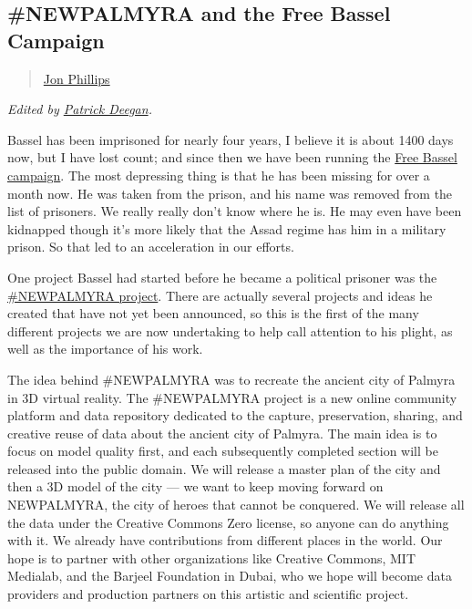 \subsection{\#NEWPALMYRA and the Free Bassel
Campaign}\label{newpalmyra-and-the-free-bassel-campaign}

\begin{quote}
\href{../appendix/attributions.html\#jon-phillips}{Jon Phillips}
\end{quote}

\emph{Edited by
\href{../appendix/attributions.html\#patrick-w-deegan}{Patrick Deegan}.}

Bassel has been imprisoned for nearly four years, I believe it is about
1400 days now, but I have lost count; and since then we have been
running the \href{http://freebassel.org/}{Free Bassel campaign}. The
most depressing thing is that he has been missing for over a month now.
He was taken from the prison, and his name was removed from the list of
prisoners. We really really don't know where he is. He may even have
been kidnapped though it's more likely that the Assad regime has him in
a military prison. So that led to an acceleration in our efforts.

One project Bassel had started before he became a political prisoner was
the \href{http://newpalmyra.org/}{\#NEWPALMYRA project}. There are
actually several projects and ideas he created that have not yet been
announced, so this is the first of the many different projects we are
now undertaking to help call attention to his plight, as well as the
importance of his work.

The idea behind \#NEWPALMYRA was to recreate the ancient city of Palmyra
in 3D virtual reality. The \#NEWPALMYRA project is a new online
community platform and data repository dedicated to the capture,
preservation, sharing, and creative reuse of data about the ancient city
of Palmyra. The main idea is to focus on model quality first, and each
subsequently completed section will be released into the public domain.
We will release a master plan of the city and then a 3D model of the
city --- we want to keep moving forward on NEWPALMYRA, the city of
heroes that cannot be conquered. We will release all the data under the
Creative Commons Zero license, so anyone can do anything with it. We
already have contributions from different places in the world. Our hope
is to partner with other organizations like Creative Commons, MIT
Medialab, and the Barjeel Foundation in Dubai, who we hope will become
data providers and production partners on this artistic and scientific
project.

